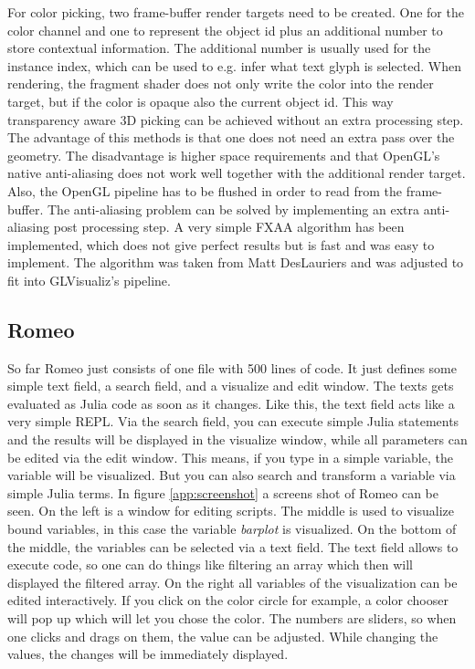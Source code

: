 For color picking, two frame-buffer render targets need to be created. 
One for the color channel and one to represent the object id plus an additional number to store contextual information. The additional number is usually used for the instance index, which can be used to e.g. infer what text glyph is selected.
When rendering, the fragment shader does not only write the color into the render target, but if the color is opaque also the current object id.
This way transparency aware 3D picking can be achieved without an extra processing step. 
The advantage of this methods is that one does not need an extra pass over the geometry. The disadvantage is higher space requirements and that OpenGL's native anti-aliasing does not work well together with the additional render target. Also, the OpenGL pipeline has to be flushed in order to read from the frame-buffer.
The anti-aliasing problem can be solved by implementing an extra anti-aliasing post processing step. A very simple FXAA algorithm has been implemented, which does not give perfect results but is fast and was easy to implement. The algorithm was taken from Matt DesLauriers\cite{FXAA} and was adjusted to fit into GLVisualiz's pipeline.


\subsection{Romeo}

So far Romeo just consists of one file with 500 lines of code. It just defines some simple text field, a search field, and a visualize and edit window.
The texts gets evaluated as Julia code as soon as it changes. Like this, the text field acts like a very simple \ac{REPL}.
Via the search field, you can execute simple Julia statements and the results will be displayed in the visualize window, while all parameters can be edited via the edit window.
This means, if you type in a simple variable, the variable will be visualized. But you can also search and transform a variable via simple Julia terms.
In figure \ref{app:screenshot} a screens shot of Romeo can be seen.
On the left is a window for editing scripts. The middle is used to visualize bound variables, in this case the variable \textit{barplot} is visualized.
On the bottom of the middle, the variables can be selected via a text field. The text field allows to execute code, so one can do things like filtering an array which then will displayed the filtered array.
On the right all variables of the visualization can be edited interactively.
If you click on the color circle for example, a color chooser will pop up which will let you chose the color.
The numbers are sliders, so when one clicks and drags on them, the value can be adjusted. 
While changing the values, the changes will be immediately displayed.

